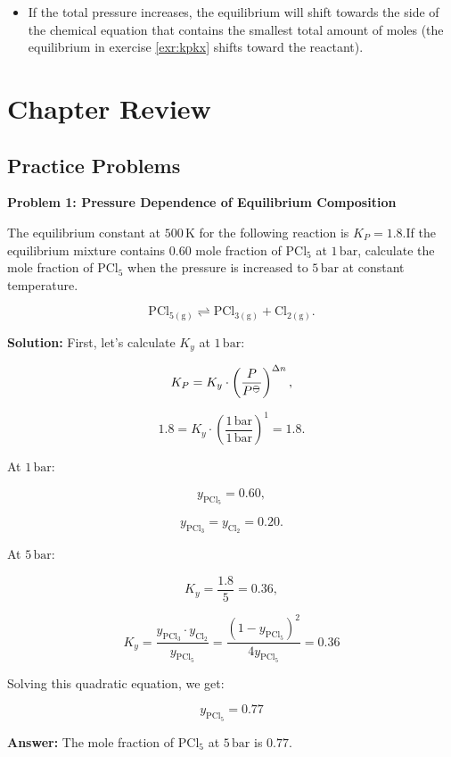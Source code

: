 \documentclass[
  9pt,
]{extbook}
\providecommand{\tightlist}{%
  \setlength{\itemsep}{0pt}\setlength{\parskip}{0pt}}
\theoremstyle{definition}
\theoremstyle{definition}
\theoremstyle{definition}
\theoremstyle{definition}
\theoremstyle{remark}
\begin{document}
\begin{itemize}
\tightlist
\item
  If the total pressure increases, the equilibrium will shift towards the side of the chemical equation that contains the smallest total amount of moles (the equilibrium in exercise \ref{exr:kpkx} shifts toward the reactant).
\end{itemize}

\section{Chapter Review}\label{rev10}

\subsection{Practice Problems}\label{exer10}

\textbf{Problem 1: Pressure Dependence of Equilibrium Composition}

The equilibrium constant at \(500\,\text{K}\) for the following reaction is \(K_P = 1.8\).If the equilibrium mixture contains \(0.60\) mole fraction of \(\text{PCl}_5\) at \(1\,\text{bar}\), calculate the mole fraction of \(\text{PCl}_5\) when the pressure is increased to \(5\,\text{bar}\) at constant temperature.

\[\text{PCl}_{5(\text{g})} \rightleftharpoons \text{PCl}_{3(\text{g})} + \text{Cl}_{2(\text{g})}.\]

\textbf{Solution:} First, let's calculate \(K_y\) at \(1\,\text{bar}\):

\[K_P = K_y \cdot \left(\frac{P}{P^{{-\kern-6pt{\ominus}\kern-6pt-}}}\right)^{\Delta n},\]

\[1.8 = K_y \cdot \left(\frac{1\,\text{bar}}{1\,\text{bar}}\right)^1 = 1.8.\]

At \(1\,\text{bar}\):

\[y_{\text{PCl}_5} = 0.60,\]

\[y_{\text{PCl}_3} = y_{\text{Cl}_2} = 0.20.\]

At \(5\,\text{bar}\):

\[K_y = \frac{1.8}{5} = 0.36,\]

\[K_y = \frac{y_{\text{PCl}_3} \cdot y_{\text{Cl}_2}}{y_{\text{PCl}_5}} = \frac{(1-y_{\text{PCl}_5})^2}{4y_{\text{PCl}_5}} = 0.36\]

Solving this quadratic equation, we get:

\[y_{\text{PCl}_5} = 0.77\]

\textbf{Answer:} The mole fraction of \(\text{PCl}_5\) at \(5\,\text{bar}\) is \(0.77\).
\end{document}
